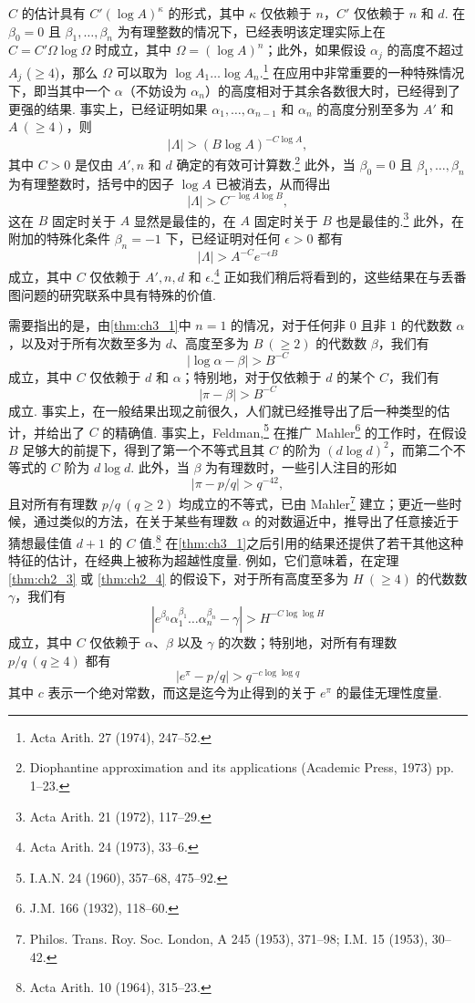 $C$ 的估计具有 $C'(\log A)^\kappa$ 的形式，其中 $\kappa$ 仅依赖于 $n$，$C'$ 仅依赖于 $n$ 和 $d$. 在 $\beta_0 = 0$ 且 $\beta_1, \dots, \beta_n$ 为有理整数的情况下，已经表明该定理实际上在 $C = C'\Omega \log \Omega$ 时成立，其中 $\Omega = (\log A)^n$；此外，如果假设 $\alpha_j$ 的高度不超过 $A_j$ ($\ge 4$)，那么 $\Omega$ 可以取为 $\log A_1 \dots \log A_n$.\footnote{Acta Arith. 27 (1974), 247--52.} 在应用中非常重要的一种特殊情况下，即当其中一个 $\alpha$（不妨设为 $\alpha_n$）的高度相对于其余各数很大时，已经得到了更强的结果. 事实上，已经证明如果 $\alpha_1, \dots, \alpha_{n-1}$ 和 $\alpha_n$ 的高度分别至多为 $A'$ 和 $A \ (\ge 4)$，则
\[
|\Lambda| > (B\log A)^{-C\log A},
\]
其中 $C > 0$ 是仅由 $A', n$ 和 $d$ 确定的有效可计算数.\footnote{Diophantine approximation and its applications (Academic Press, 1973) pp. 1--23.} 此外，当 $\beta_0 = 0$ 且 $\beta_1, \dots, \beta_n$ 为有理整数时，括号中的因子 $\log A$ 已被消去，从而得出
\[
|\Lambda| > C^{-\log A \log B},
\]
这在 $B$ 固定时关于 $A$ 显然是最佳的，在 $A$ 固定时关于 $B$ 也是最佳的.\footnote{Acta Arith. 21 (1972), 117--29.} 此外，在附加的特殊化条件 $\beta_n = -1$ 下，已经证明对任何 $\epsilon > 0$ 都有
\[
|\Lambda| > A^{-C} e^{-\epsilon B}
\]
成立，其中 $C$ 仅依赖于 $A', n, d$ 和 $\epsilon$.\footnote{Acta Arith. 24 (1973), 33--6.} 正如我们稍后将看到的，这些结果在与丢番图问题的研究联系中具有特殊的价值.

需要指出的是，由\autoref{thm:ch3_1}中 $n = 1$ 的情况，对于任何非 $0$ 且非 $1$ 的代数数 $\alpha$，以及对于所有次数至多为 $d$、高度至多为 $B \ (\ge 2)$ 的代数数 $\beta$，我们有
\[
|\log \alpha - \beta| > B^{-C}
\]
成立，其中 $C$ 仅依赖于 $d$ 和 $\alpha$；特别地，对于仅依赖于 $d$ 的某个 $C$，我们有
\[
|\pi - \beta| > B^{-C}
\]
成立. 事实上，在一般结果出现之前很久，人们就已经推导出了后一种类型的估计，并给出了 $C$ 的精确值. 事实上，Feldman,\footnote{I.A.N. 24 (1960), 357--68, 475--92.} 在推广 Mahler\footnote{J.M. 166 (1932), 118--60.} 的工作时，在假设 $B$ 足够大的前提下，得到了第一个不等式且其 $C$ 的阶为 $(d \log d)^2$，而第二个不等式的 $C$ 阶为 $d \log d$. 此外，当 $\beta$ 为有理数时，一些引人注目的形如
\[
|\pi-p/q| > q^{-42},
\]
且对所有有理数 $p/q \ (q \ge 2)$ 均成立的不等式，已由 Mahler\footnote{Philos. Trans. Roy. Soc. London, A 245 (1953), 371--98; I.M. 15 (1953), 30--42.} 建立；更近一些时候，通过类似的方法，在关于某些有理数 $\alpha$ 的对数逼近中，推导出了任意接近于猜想最佳值 $d+1$ 的 $C$ 值.\footnote{Acta Arith. 10 (1964), 315--23.} 在\autoref{thm:ch3_1}之后引用的结果还提供了若干其他这种特征的估计，在经典上被称为超越性度量. 例如，它们意味着，在定理 \ref{thm:ch2_3} 或 \ref{thm:ch2_4} 的假设下，对于所有高度至多为 $H \ (\ge 4)$ 的代数数 $\gamma$，我们有
\[
|e^{\beta_0}\alpha_1^{\beta_1}\dots\alpha_n^{\beta_n}-\gamma| > H^{-C\log\log H}
\]
成立，其中 $C$ 仅依赖于 $\alpha$、$\beta$ 以及 $\gamma$ 的次数；特别地，对所有有理数 $p/q \ (q \ge 4)$ 都有
\[
|e^\pi - p/q| > q^{-c \log \log q}
\]
其中 $c$ 表示一个绝对常数，而这是迄今为止得到的关于 $e^\pi$ 的最佳无理性度量.

